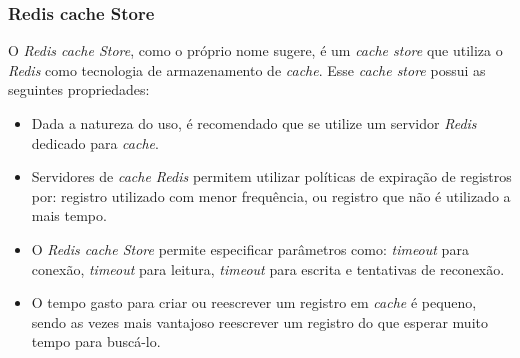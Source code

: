 \subsubsection{Redis cache Store}

O \textit{Redis cache Store}, como o próprio nome sugere, é um \textit{cache store} que utiliza o \textit{Redis} como tecnologia de armazenamento de \textit{cache}. Esse \textit{cache store} possui as seguintes propriedades:

\begin{itemize}
    \item Dada a natureza do uso, é recomendado que se utilize um servidor \textit{Redis} dedicado para \textit{cache}.
    \item Servidores de \textit{cache Redis} permitem utilizar políticas de expiração de registros por: registro utilizado com menor frequência, ou registro que não é utilizado a mais tempo.
    \item O \textit{Redis cache Store} permite especificar parâmetros como: \textit{timeout} para conexão, \textit{timeout} para leitura, \textit{timeout} para escrita e tentativas de reconexão.
    \item O tempo gasto para criar ou reescrever um registro em \textit{cache} é pequeno, sendo as vezes mais vantajoso reescrever um registro do que esperar muito tempo para buscá-lo.
\end{itemize}